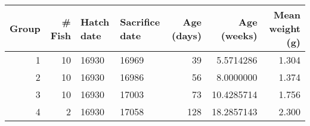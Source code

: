 \begin{tabular}{rrllrrr}
  \toprule Group & \# Fish & Hatch date & Sacrifice date & Age (days) & Age (weeks) & Mean weight (g) \\ 
  \midrule 1 & 10 & 16930 & 16969 & 39 & 5.5714286 & 1.304 \\ 
  2 & 10 & 16930 & 16986 & 56 & 8.0000000 & 1.374 \\ 
  3 & 10 & 16930 & 17003 & 73 & 10.4285714 & 1.756 \\ 
  4 & 2 & 16930 & 17058 & 128 & 18.2857143 & 2.300 \\ 
   \bottomrule \end{tabular}
